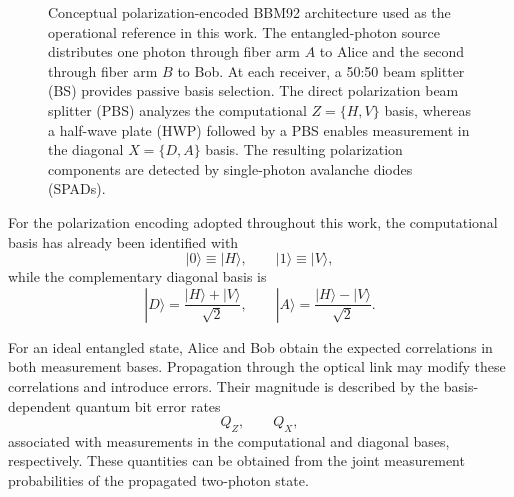 \begin{figure}[htbp]
{
    }

    \caption{
    Conceptual polarization-encoded BBM92 architecture used as the operational
    reference in this work. The entangled-photon source distributes one photon
    through fiber arm \(A\) to Alice and the second through fiber arm \(B\) to
    Bob. At each receiver, a 50:50 beam splitter (BS) provides passive basis
    selection. The direct polarization beam splitter (PBS) analyzes the
    computational \(Z=\{H,V\}\) basis, whereas a half-wave plate (HWP) followed
    by a PBS enables measurement in the diagonal \(X=\{D,A\}\) basis.
    The resulting polarization components are detected by single-photon
    avalanche diodes (SPADs).
    }
    \label{fig:bbm92_reference_architecture}

\end{figure}

For the polarization encoding adopted throughout this work, the computational
basis has already been identified with
\begin{equation}
|0\rangle\equiv|H\rangle,
\qquad
|1\rangle\equiv|V\rangle,
\nonumber
\end{equation}
while the complementary diagonal basis is
\begin{equation}
|D\rangle
=
\frac{|H\rangle+|V\rangle}{\sqrt{2}},
\qquad
|A\rangle
=
\frac{|H\rangle-|V\rangle}{\sqrt{2}}.
\label{eq:bbm92_diagonal_basis}
\end{equation}

For an ideal entangled state, Alice and Bob obtain the expected correlations in both measurement bases. Propagation through the optical link may modify these correlations and introduce errors. Their magnitude is described by the basis-dependent quantum bit error rates
\begin{equation}
Q_Z,
\qquad
Q_X,
\label{eq:bbm92_basis_qber}
\end{equation}
associated with measurements in the computational and diagonal bases, respectively. These quantities can be obtained from the joint measurement probabilities of the propagated two-photon state.

